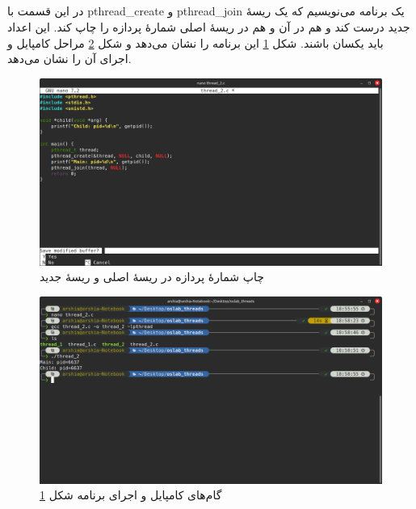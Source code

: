 \documentclass[12pt]{article}
\begin{document}
	\subsection{}
	در این قسمت با \textenglish{pthread\_create} و \textenglish{pthread\_join} یک برنامه می‌نویسیم که یک ریسهٔ جدید درست کند و هم در آن و هم در ریسهٔ اصلی شمارهٔ پردازه را چاپ کند. این اعداد باید یکسان باشند. شکل \ref{img:3} این برنامه را نشان می‌دهد و شکل \ref{img:4} مراحل کامپایل و اجرای آن را نشان می‌دهد.
	\begin{figure}[H]
		\centering
		\includegraphics[width=\textwidth]{report7-resources/3.png}
		\caption{چاپ شمارهٔ پردازه در ریسهٔ اصلی و ریسهٔ جدید}
		\label{img:3}
	\end{figure}
	\begin{figure}[H]
		\centering
		\includegraphics[width=\textwidth]{report7-resources/4.png}
		\caption{گام‌های کامپایل و اجرای برنامه شکل \ref{img:3}}
		\label{img:4}
	\end{figure}
\end{document}
